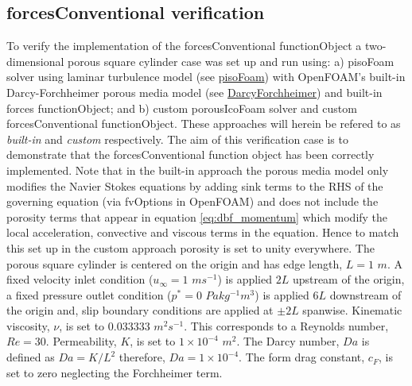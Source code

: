 \documentclass[a4paper,11pt]{report}
\begin{document}
\subsection{forcesConventional verification}
\label{subsec:forcesConventional_verification}

To verify the implementation of the forcesConventional functionObject a two-dimensional porous square cylinder case was set up and run using: a) pisoFoam solver using laminar turbulence model (see \href{https://www.openfoam.com/documentation/guides/latest/doc/guide-applications-solvers-incompressible-pisoFoam.html}{pisoFoam}) with OpenFOAM's built-in Darcy-Forchheimer porous media model (see \href{https://www.openfoam.com/documentation/guides/latest/api/classFoam_1_1porosityModels_1_1DarcyForchheimer.html}{DarcyForchheimer}) and built-in forces functionObject; and b) custom porousIcoFoam solver and custom forcesConventional functionObject. These approaches will herein be refered to as \emph{built-in} and \emph{custom} respectively. The aim of this verification case is to demonstrate that the forcesConventional function object has been correctly implemented. Note that in the built-in approach the porous media model only modifies the Navier Stokes equations by adding sink terms to the RHS of the governing equation (via fvOptions in OpenFOAM) and does not include the porosity terms that appear in equation \ref{eq:dbf_momentum} which modify the local acceleration, convective and viscous terms in the equation. Hence to match this set up in the custom approach porosity is set to unity everywhere. The porous square cylinder is centered on the origin and has edge length, $L = 1$ $m$. A fixed velocity inlet condition ($u_{\infty} = 1$ $ms^{-1}$) is applied $2L$ upstream of the origin, a fixed pressure outlet condition ($p^{*} = 0$ $Pakg^{-1}m^3$) is applied $6L$ downstream of the origin and, slip boundary conditions are applied at $\pm2L$ spanwise. Kinematic viscosity, $\nu$, is set to $0.033333$ $m^2s^{-1}$. This corresponds to a Reynolds number, $Re = 30$. Permeability, $K$, is set to $1\times10^{-4}$ $m^{2}$. The Darcy number, $Da$ is defined as $Da = K/L^{2}$ therefore, $Da = 1\times10^{-4}$. The form drag constant, $c_F$, is set to zero neglecting the Forchheimer term.
\end{document}
